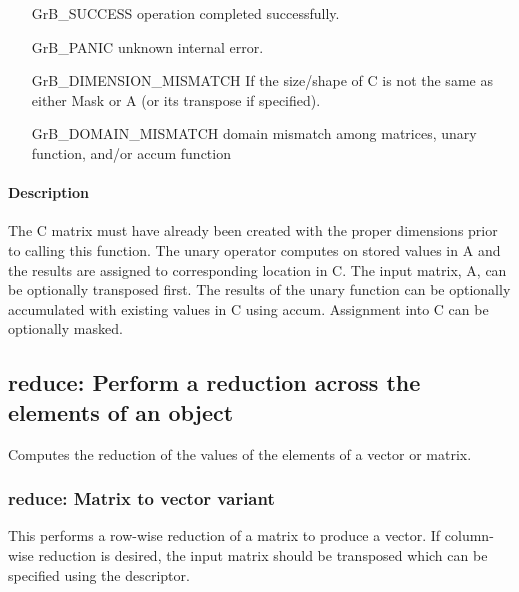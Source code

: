 \begin{itemize}[leftmargin=2.1in]
\item[{\sf GrB\_SUCCESS}]     operation completed successfully.
\item[{\sf GrB\_PANIC}]        unknown internal error.
\item[{\sf GrB\_DIMENSION\_MISMATCH}]            
        If the size/shape of {\sf C} is not the same as either {\sf Mask} or {\sf A} (or its transpose if specified).
\item[{\sf GrB\_DOMAIN\_MISMATCH}]  
        domain mismatch among matrices, unary function, and/or
        accum function 
\end{itemize}

\paragraph{Description}

The {\sf C} matrix must have already been created with the proper dimensions
prior to calling this function.  The unary operator computes on stored values in {\sf A} and the results are assigned to corresponding location in {\sf C}.
The input matrix, {\sf A}, can be optionally transposed first.  The results of the unary function can be optionally accumulated with existing values in {\sf C} using accum.  Assignment into {\sf C} can be optionally masked.


\subsection{{\sf reduce}: Perform a reduction across the elements of an object}

Computes the reduction of the values of the elements of a vector or matrix.

\subsubsection{{\sf reduce}: Matrix to vector variant}

This performs a row-wise reduction of a matrix to produce a vector.  If column-wise reduction
is desired, the input matrix should be transposed which can be specified using the descriptor.

\paragraph{\syntax}

